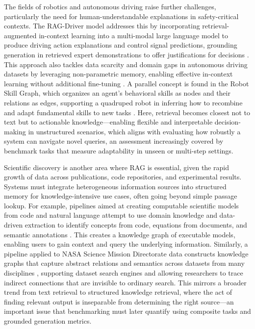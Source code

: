 \documentclass[11pt]{article}
\begin{document}
The fields of robotics and autonomous driving raise further challenges, particularly the need for human-understandable explanations in safety-critical contexts. The RAG-Driver model addresses this by incorporating retrieval-augmented in-context learning into a multi-modal large language model to produce driving action explanations and control signal predictions, grounding generation in retrieved expert demonstrations to offer justifications for decisions \cite{ref206}. This approach also tackles data scarcity and domain gaps in autonomous driving datasets by leveraging non-parametric memory, enabling effective in-context learning without additional fine-tuning \cite{ref206}. A parallel concept is found in the Robot Skill Graph, which organizes an agent's behavioral skills as nodes and their relations as edges, supporting a quadruped robot in inferring how to recombine and adapt fundamental skills to new tasks \cite{ref207}. Here, retrieval becomes closest not to text but to actionable knowledge---enabling flexible and interpretable decision-making in unstructured scenarios, which aligns with evaluating how robustly a system can navigate novel queries, an assessment increasingly covered by benchmark tasks that measure adaptability in unseen or multi-step settings.

Scientific discovery is another area where RAG is essential, given the rapid growth of data across publications, code repositories, and experimental results. Systems must integrate heterogeneous information sources into structured memory for knowledge-intensive use cases, often going beyond simple passage lookup. For example, pipelines aimed at creating computable scientific models from code and natural language attempt to use domain knowledge and data-driven extraction to identify concepts from code, equations from documents, and semantic annotations \cite{ref208}. This creates a knowledge graph of executable models, enabling users to gain context and query the underlying information. Similarly, a pipeline applied to NASA Science Mission Directorate data constructs knowledge graphs that capture abstract relations and semantics across datasets from many disciplines \cite{ref209}, supporting dataset search engines and allowing researchers to trace indirect connections that are invisible to ordinary search. This mirrors a broader trend from text retrieval to structured knowledge retrieval, where the act of finding relevant output is inseparable from determining the right source---an important issue that benchmarking must later quantify using composite tasks and grounded generation metrics.
\end{document}
